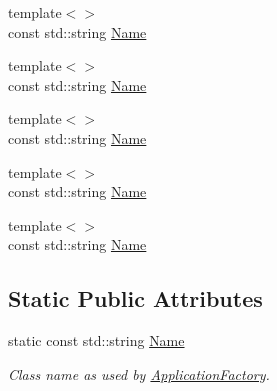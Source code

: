 \begin{DoxyCompactItemize}
\item 
{\footnotesize template$<$$>$ }\\const std\+::string \hyperlink{classUintah_1_1PhaseField_1_1Heat_ae3f72af7abe8777489750b4cca9d0386}{Name}
\item 
{\footnotesize template$<$$>$ }\\const std\+::string \hyperlink{classUintah_1_1PhaseField_1_1Heat_aaadfc711b6e8dbf57965173385ff8de8}{Name}
\item 
{\footnotesize template$<$$>$ }\\const std\+::string \hyperlink{classUintah_1_1PhaseField_1_1Heat_a8f6c6b9bf9e87ad27b76232b415635ff}{Name}
\item 
{\footnotesize template$<$$>$ }\\const std\+::string \hyperlink{classUintah_1_1PhaseField_1_1Heat_a0d9863c94a0326eec3640b49cdb1fbf8}{Name}
\item 
{\footnotesize template$<$$>$ }\\const std\+::string \hyperlink{classUintah_1_1PhaseField_1_1Heat_a273e338193aa6830f8d5fe48a8772bf4}{Name}
\end{DoxyCompactItemize}
\subsection*{Static Public Attributes}
\begin{DoxyCompactItemize}
\item 
static const std\+::string \hyperlink{classUintah_1_1PhaseField_1_1Heat_a98f261632a91a2cac5800b938c1b9518}{Name}
\begin{DoxyCompactList}\small\item\em Class name as used by \hyperlink{classUintah_1_1PhaseField_1_1ApplicationFactory}{Application\+Factory}. \end{DoxyCompactList}\end{DoxyCompactItemize}
